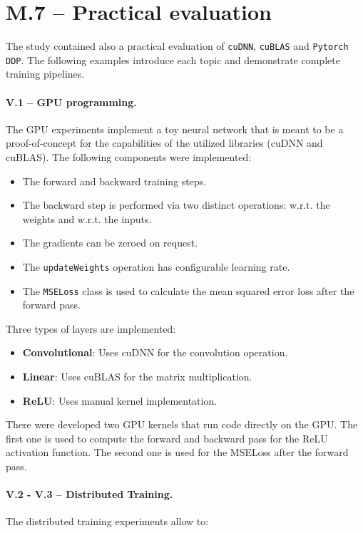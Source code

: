 
\section{M.7 -- Practical evaluation}
\label{sec:practical-evaluation}
The study contained also a practical evaluation of \texttt{cuDNN}, \texttt{cuBLAS} and \texttt{Pytorch DDP}.
The following examples introduce each topic and demonstrate complete training pipelines.

\paragraph{V.1 -- GPU programming.}
The GPU experiments implement a toy neural network that is meant to be a proof-of-concept for the
capabilities of the utilized libraries (cuDNN and cuBLAS). The following components were
implemented:

\begin{itemize}
	\item The forward and backward training steps.
	\item The backward step is performed via two distinct operations: w.r.t. the weights and w.r.t. the
	      inputs.
	\item The gradients can be zeroed on request.
	\item The \texttt{updateWeights} operation has configurable learning rate.
	\item The \texttt{MSELoss} class is used to calculate the mean squared error loss after the forward pass.

\end{itemize}

Three types of layers are implemented:
\begin{itemize}
	\item \textbf{Convolutional}: Uses cuDNN for the convolution operation.
	\item \textbf{Linear}: Uses cuBLAS for the matrix multiplication.
	\item \textbf{ReLU}: Uses manual kernel implementation.
\end{itemize}

There were developed two GPU kernels that run code directly on the GPU. The first one is used to
compute the forward and backward pass for the ReLU activation function. The second one is used for
the MSELoss after the forward pass.

\paragraph{V.2 - V.3 -- Distributed Training.}
The distributed training experiments allow to:

